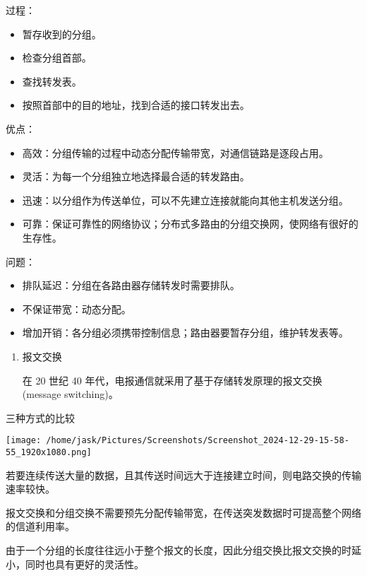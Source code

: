 \documentclass[11pt]{article}
\begin{document}
\begin{enumerate}
\begin{enumerate}
过程：
\begin{itemize}
\item 暂存收到的分组。

\item 检查分组首部。

\item 查找转发表。
\end{itemize}
\end{enumerate}


\begin{itemize}
\item 按照首部中的目的地址，找到合适的接口转发出去。
\end{itemize}
优点：
\begin{itemize}
\item 高效：分组传输的过程中动态分配传输带宽，对通信链路是逐段占用。
\item 灵活：为每一个分组独立地选择最合适的转发路由。
\item 迅速：以分组作为传送单位，可以不先建立连接就能向其他主机发送分组。
\item 可靠：保证可靠性的网络协议；分布式多路由的分组交换网，使网络有很好的生存性。
\end{itemize}

问题：
\begin{itemize}
\item 排队延迟：分组在各路由器存储转发时需要排队。
\item 不保证带宽：动态分配。
\item 增加开销：各分组必须携带控制信息；路由器要暂存分组，维护转发表等。
\end{itemize}

\begin{enumerate}
\item 报文交换

在 20 世纪 40 年代，电报通信就采用了基于存储转发原理的报文交换 (message switching)。
\end{enumerate}

三种方式的比较
\begin{center}
\texttt{[image: /home/jask/Pictures/Screenshots/Screenshot\_2024-12-29-15-58-55\_1920x1080.png]}
\end{center}

若要连续传送大量的数据，且其传送时间远大于连接建立时间，则电路交换的传输速率较快。

报文交换和分组交换不需要预先分配传输带宽，在传送突发数据时可提高整个网络的信道利用率。

由于一个分组的长度往往远小于整个报文的长度，因此分组交换比报文交换的时延小，同时也具有更好的灵活性。
\end{enumerate}
\end{document}
